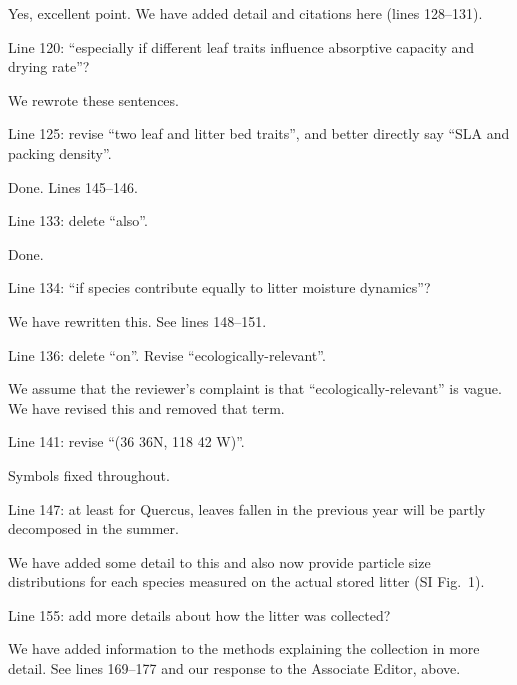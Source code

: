 \documentclass[letterpaper, 12pt]{letter}
\begin{document}
\begin{letter}{}
Yes, excellent point. We have added detail and citations here (lines 128--131).

\begin{quoting}
  Line 120: “especially if different leaf traits influence absorptive capacity
  and drying rate”?
\end{quoting}

We rewrote these sentences.

\begin{quoting}
  Line 125: revise “two leaf and litter bed traits”, and better directly say
  “SLA and packing density”.
\end{quoting}

Done. Lines 145--146.

\begin{quoting}
  Line 133: delete “also”.
\end{quoting}

Done.

\begin{quoting}
  Line 134: “if species contribute equally to litter moisture dynamics”?
\end{quoting}

We have rewritten this. See lines 148--151.

\begin{quoting}
  Line 136: delete “on”. Revise “ecologically-relevant”.
\end{quoting}

We assume that the reviewer's complaint is that ``ecologically-relevant'' is
vague. We have revised this and removed that term.

\begin{quoting}
Line 141: revise “(36 36N, 118 42 W)”.
\end{quoting}

Symbols fixed throughout.

\begin{quoting}
  Line 147: at least for Quercus, leaves fallen in the previous year will be
  partly decomposed in the summer.
\end{quoting}

We have added some detail to this and also now provide particle size
distributions for each species measured on the actual stored litter (SI Fig.~1).

\begin{quoting}
  Line 155: add more details about how the litter was collected?
\end{quoting}

We have added information to the methods explaining the collection in more
detail. See lines 169--177 and our response to the Associate Editor, above.


\end{letter}
\end{document}
